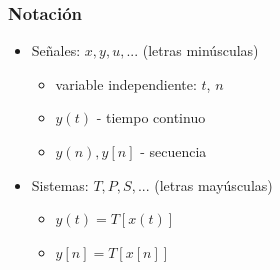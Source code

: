 \begin{frame}
  \frametitle{Notación}
  \begin{figure}
    \centering
    \small
  \end{figure}

  
  \begin{block}{}
  \begin{itemize}
    \item Señales: $x,y,u,...$ (letras minúsculas)
    \begin{itemize}
      \item variable independiente: $t$, $n$
      \item $y(t)$ - tiempo continuo
      \item $y(n), y[n]$ - secuencia
    \end{itemize}
    \item Sistemas: $T,P,S,...$ (letras mayúsculas)
    \begin{itemize}
      \item $y(t)=T[x(t)]$
      \item $y[n]=T[x[n]]$
    \end{itemize}
  \end{itemize}
  \end{block}
\end{frame}
